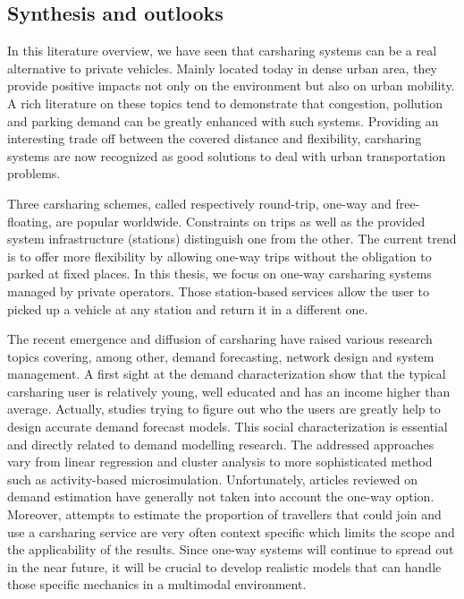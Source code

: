 \begin{bibunit}[ieeetr]
\section{Synthesis and outlooks}

In this literature overview, we have seen that carsharing systems can be a real alternative to private vehicles.
Mainly located today in dense urban area, they provide positive impacts not only on the environment but also on urban mobility.
A rich literature on these topics tend to demonstrate that congestion, pollution and parking demand can be greatly enhanced with such systems.
Providing an interesting trade off between the covered distance and flexibility, carsharing systems are now recognized as good solutions to deal with urban transportation problems.

\medskip
Three carsharing schemes, called respectively round-trip, one-way and free-floating, are popular worldwide.
Constraints on trips as well as the provided system infrastructure (stations) distinguish one from the other.
The current trend is to offer more flexibility by allowing one-way trips without the obligation to parked at fixed places.
In this thesis, we focus on one-way carsharing systems managed by private operators.
Those station-based services allow the user to picked up a vehicle at any station and return it in a different one.


\medskip
The recent emergence and diffusion of carsharing have raised various research topics covering, among other, demand forecasting, network design and system management.
A first sight at the demand characterization show that the typical carsharing user is relatively young, well educated and has an income higher than average.
Actually, studies trying to figure out who the users are greatly help to design accurate demand forecast models.
This social characterization is essential and directly related to demand modelling research.
The addressed approaches vary from linear regression and cluster analysis to more sophisticated method such as activity-based microsimulation.
Unfortunately, articles reviewed on demand estimation have generally not taken into account the one-way option.
Moreover, attempts to estimate the proportion of travellers that could join and use a carsharing service are very often context specific which limits the scope and the applicability of the results.
Since one-way systems will continue to spread out in the near future, it will be crucial to develop realistic models that can handle those specific mechanics in a multimodal environment.



\end{bibunit}
